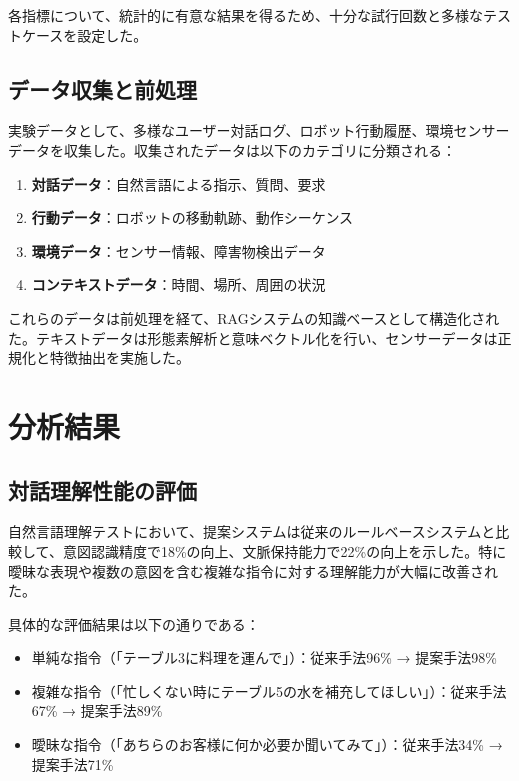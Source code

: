\documentclass[12pt]{report}
\begin{document}
各指標について、統計的に有意な結果を得るため、十分な試行回数と多様なテストケースを設定した。

\subsection{データ収集と前処理}
\label{subsec:data_collection}

実験データとして、多様なユーザー対話ログ、ロボット行動履歴、環境センサーデータを収集した。収集されたデータは以下のカテゴリに分類される：

\begin{enumerate}
  \item \textbf{対話データ}：自然言語による指示、質問、要求
  \item \textbf{行動データ}：ロボットの移動軌跡、動作シーケンス
  \item \textbf{環境データ}：センサー情報、障害物検出データ
  \item \textbf{コンテキストデータ}：時間、場所、周囲の状況
\end{enumerate}

これらのデータは前処理を経て、RAGシステムの知識ベースとして構造化された。テキストデータは形態素解析と意味ベクトル化を行い、センサーデータは正規化と特徴抽出を実施した。

\section{分析結果}
\label{sec:results}

\subsection{対話理解性能の評価}
\label{subsec:dialogue_performance}

自然言語理解テストにおいて、提案システムは従来のルールベースシステムと比較して、意図認識精度で18\%の向上、文脈保持能力で22\%の向上を示した。特に曖昧な表現や複数の意図を含む複雑な指令に対する理解能力が大幅に改善された。

具体的な評価結果は以下の通りである：
\begin{itemize}
  \item 単純な指令（「テーブル3に料理を運んで」）：従来手法96\% → 提案手法98\%
  \item 複雑な指令（「忙しくない時にテーブル5の水を補充してほしい」）：従来手法67\% → 提案手法89\%
  \item 曖昧な指令（「あちらのお客様に何か必要か聞いてみて」）：従来手法34\% → 提案手法71\%
\end{itemize}
\end{document}
